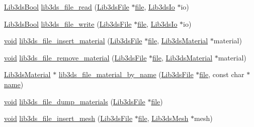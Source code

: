 \begin{DoxyCompactItemize}
\hyperlink{types_8h_a89dd7398a9ebbbf28011f8c32df67ad3}{Lib3ds\-Bool} \hyperlink{group__file_gafc16e637b972429e1be6e1a3331d3935}{lib3ds\-\_\-file\-\_\-read} (\hyperlink{struct_lib3ds_file}{Lib3ds\-File} $\ast$\hyperlink{uavobjecttemplate_8m_a97c04efa65bcf0928abf9260bc5cbf46}{file}, \hyperlink{struct_lib3ds_io}{Lib3ds\-Io} $\ast$io)
\item 
\hyperlink{types_8h_a89dd7398a9ebbbf28011f8c32df67ad3}{Lib3ds\-Bool} \hyperlink{group__file_gab9a387374683720ccb9e669ff673645d}{lib3ds\-\_\-file\-\_\-write} (\hyperlink{struct_lib3ds_file}{Lib3ds\-File} $\ast$\hyperlink{uavobjecttemplate_8m_a97c04efa65bcf0928abf9260bc5cbf46}{file}, \hyperlink{struct_lib3ds_io}{Lib3ds\-Io} $\ast$io)
\item 
\hyperlink{group___u_a_v_objects_plugin_ga444cf2ff3f0ecbe028adce838d373f5c}{void} \hyperlink{group__file_ga159164f89b6f5517af968417966917f0}{lib3ds\-\_\-file\-\_\-insert\-\_\-material} (\hyperlink{struct_lib3ds_file}{Lib3ds\-File} $\ast$\hyperlink{uavobjecttemplate_8m_a97c04efa65bcf0928abf9260bc5cbf46}{file}, \hyperlink{struct_lib3ds_material}{Lib3ds\-Material} $\ast$material)
\item 
\hyperlink{group___u_a_v_objects_plugin_ga444cf2ff3f0ecbe028adce838d373f5c}{void} \hyperlink{group__file_ga1c40fb9be5c5c0c1db2255d5b2f184a7}{lib3ds\-\_\-file\-\_\-remove\-\_\-material} (\hyperlink{struct_lib3ds_file}{Lib3ds\-File} $\ast$\hyperlink{uavobjecttemplate_8m_a97c04efa65bcf0928abf9260bc5cbf46}{file}, \hyperlink{struct_lib3ds_material}{Lib3ds\-Material} $\ast$material)
\item 
\hyperlink{struct_lib3ds_material}{Lib3ds\-Material} $\ast$ \hyperlink{group__file_gadd2ea2b05ea167d9d82bb2d31c25f210}{lib3ds\-\_\-file\-\_\-material\-\_\-by\-\_\-name} (\hyperlink{struct_lib3ds_file}{Lib3ds\-File} $\ast$\hyperlink{uavobjecttemplate_8m_a97c04efa65bcf0928abf9260bc5cbf46}{file}, const char $\ast$\hyperlink{glext_8h_ad977737dfc9a274a62741b9500c49a32}{name})
\item 
\hyperlink{group___u_a_v_objects_plugin_ga444cf2ff3f0ecbe028adce838d373f5c}{void} \hyperlink{group__file_gae68ae878585f72627e2a4fb54d575bd5}{lib3ds\-\_\-file\-\_\-dump\-\_\-materials} (\hyperlink{struct_lib3ds_file}{Lib3ds\-File} $\ast$\hyperlink{uavobjecttemplate_8m_a97c04efa65bcf0928abf9260bc5cbf46}{file})
\item 
\hyperlink{group___u_a_v_objects_plugin_ga444cf2ff3f0ecbe028adce838d373f5c}{void} \hyperlink{group__file_gaf4c01704f69e82b267eb11ec4b37aa75}{lib3ds\-\_\-file\-\_\-insert\-\_\-mesh} (\hyperlink{struct_lib3ds_file}{Lib3ds\-File} $\ast$\hyperlink{uavobjecttemplate_8m_a97c04efa65bcf0928abf9260bc5cbf46}{file}, \hyperlink{struct_lib3ds_mesh}{Lib3ds\-Mesh} $\ast$mesh)

\end{DoxyCompactItemize}
